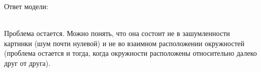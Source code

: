 Ответ модели: \\
\begin{figure}[h]
\end{figure}\\
Проблема остается. Можно понять, что она состоит не в зашумленности картинки (шум почти нулевой) и не во взаимном расположении окружностей (проблема остается и тогда, когда окружности расположены относительно далеко друг от друга). \newpage

